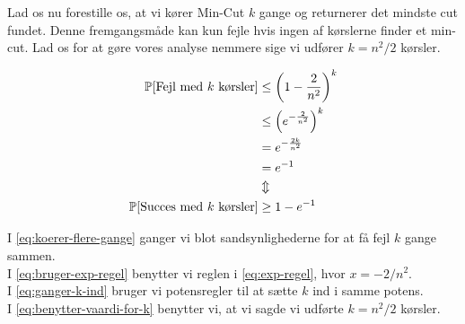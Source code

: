 Lad os nu forestille os, at vi kører Min-Cut $k$ gange og returnerer det mindste cut fundet. Denne fremgangsmåde kan kun fejle hvis ingen af kørslerne finder et min-cut. Lad os for at gøre vores analyse nemmere sige vi udfører $k = n^2/2$ kørsler.

\begin{align}
    {\mathbb P}[\text{Fejl med $k$ kørsler}] &\leq \left(  1 - \frac{2}{n^2}  \right)^k \label{eq:koerer-flere-gange} \\
                                    &\leq \left( e^{- \frac{2}{n^2}} \right)^k \label{eq:bruger-exp-regel} \\
                                    &= e^{- \frac{2k}{n^2}} \label{eq:ganger-k-ind} \\
                                    &= e^{-1} \label{eq:benytter-vaardi-for-k} \\
                                    &\Updownarrow \nonumber \\
    {\mathbb P}[\text{Succes med $k$ kørsler}] &\geq 1 - e^{-1} \nonumber
\end{align}

I \cref{eq:koerer-flere-gange} ganger vi blot sandsynlighederne for at få fejl $k$ gange sammen.\\
I \cref{eq:bruger-exp-regel} benytter vi reglen i \cref{eq:exp-regel}, hvor $x = -2/n^2$.\\
I \cref{eq:ganger-k-ind} bruger vi potensregler til at sætte $k$ ind i samme potens.\\
I \cref{eq:benytter-vaardi-for-k} benytter vi, at vi sagde vi udførte $k = n^2/2$ kørsler.

